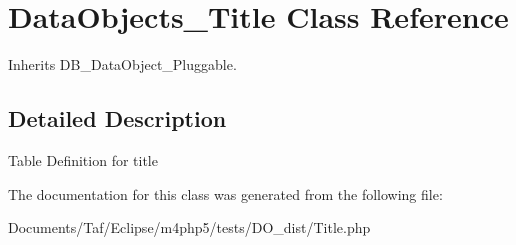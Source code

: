 \hypertarget{classDataObjects__Title}{
\section{DataObjects\_\-Title Class Reference}
\label{classDataObjects__Title}
}
Inherits DB\_\-DataObject\_\-Pluggable.



\subsection{Detailed Description}
Table Definition for title 

The documentation for this class was generated from the following file:\begin{CompactItemize}
\item 
Documents/Taf/Eclipse/m4php5/tests/DO\_\-dist/Title.php\end{CompactItemize}
